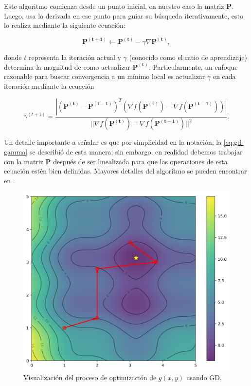 Este algoritmo comienza desde un punto inicial, en nuestro caso la matriz $\boldsymbol{P}$.
Luego, usa la derivada en ese punto para guiar su búsqueda iterativamente, 
esto lo realiza mediante la siguiente ecuación:

\begin{equation}
  \boldsymbol{P^{(t+1)}} \gets \boldsymbol{P^{(t)}} - \gamma \nabla \boldsymbol{P^{(t)}},
  \label{eq:gd-point}
\end{equation}

\noindent donde $t$ representa la iteración actual y $\gamma$ (conocido como el ratio de aprendizaje)
determina la magnitud de como actualizar $\boldsymbol{P^{(t)}}$. 
Particularmente, un enfoque razonable para buscar convergencia a 
un mínimo local es actualizar $\gamma$ en cada iteración mediante la ecuación

\begin{equation}
  \gamma^{(t+1)} = \frac{|(\boldsymbol{P^{(t)}}-\boldsymbol{P^{(t-1)}})^T(\nabla f(\boldsymbol{P^{(t)}})-\nabla f(\boldsymbol{P^{(t-1)}}))|}
  {||\nabla f(\boldsymbol{P^{(t)}})-\nabla f(\boldsymbol{P^{(t-1)}})||^2}.
  \label{eq:gd-gamma}
\end{equation}

Un detalle importante a señalar es que por simplicidad en la notación, 
la \autoref{eq:gd-gamma} se describió de esta manera;
sin embargo, en realidad debemos trabajar con la matriz $\boldsymbol{P}$ después de ser linealizada
para que las operaciones de esta ecuación estén bien definidas.
Mayores detalles del algoritmo se pueden encontrar en \cite{Demidova2020}.

\begin{figure}[ht]
  \centering
  \includegraphics[scale=0.5]{image/theory/GD.png}
   \caption{Visualización del proceso de optimización de $g(x, y)$ usando GD.}
  \label{fig:gd}
\end{figure}

